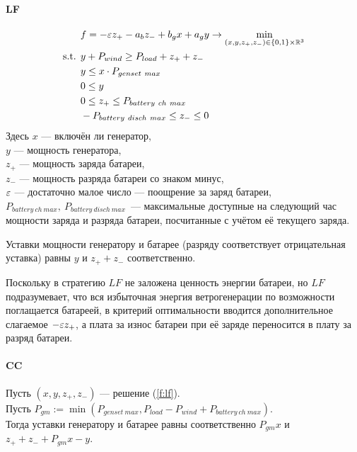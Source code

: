 \paragraph{LF}
\label{sub:lf}
\begin{equation}\label{f:lf}
\begin{split}
\vspace{-4mm}
&f = -\eps z_+ - a_b z_- 
+ b_g x + a_g y
\rightarrow \min\limits_{(x, y, z_+, z_-) \in \{0,1\} \times \R^3 }\\
\text{s.t. }& y + P_{wind} \geq P_{load} + z_+ + z_-\\
&y \leq x \cdot P_{genset~max}\\
&0 \leq y \\
&0 \leq z_+ \leq P_{battery~ch~max} \\
&-P_{battery~disch~max} \leq z_- \leq 0 \\
\end{split}
\end{equation}
Здесь $x$ --- включён ли генератор,\\
$y$ --- мощность генератора,\\
$z_+$ --- мощность заряда батареи,\\
$z_-$ --- мощность разряда батареи со знаком минус,\\
$\varepsilon$ --- достаточно малое число --- поощрение за заряд батареи,\\
$P_{battery~ch~max},~P_{battery~disch~max}$~--- максимальные доступные на следующий час мощности заряда и разряда батареи, посчитанные с учётом её текущего заряда.

Уставки мощности генератору и батарее (разряду соответствует отрицательная уставка) равны $y$ и $z_+ + z_-$ соответственно.

Поскольку в стратегию $LF$ не заложена ценность энергии батареи, но $LF$ подразумевает, что вся избыточная энергия ветрогенерации по возможности поглащается батареей, в критерий оптимальности вводится дополнительное слагаемое $-\varepsilon z_+$, а плата за износ батареи при её заряде переносится в плату за разряд батареи.


\paragraph{CC}
Пусть $(x, y, z_+, z_-)$ --- решение (\ref{f:lf}).\\
Пусть $P_{gm} := \min(P_{genset~max}, P_{load}- P_{wind} + P_{battery~ch~max})$.\\
Тогда уставки генератору и батарее равны соответственно $P_{gm}x$ и $z_+ + z_- + P_{gm}x - y$.


